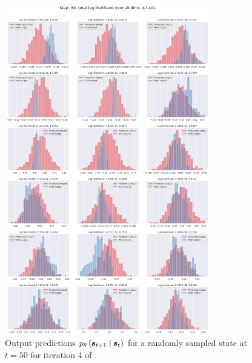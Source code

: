 \begin{figure}
    \centering
    \includegraphics[width=0.8\textwidth]{img/windyslope/output/windyslope_output_det2stoc2_dist_10_step50_iter4.png}
    \caption{Output predictions $\ptheta \protect\given*{\vns}{\vs}$ for a randomly sampled state at $t=50$ for iteration 4 of \dettostoc{}.}
    \label{fig:output_distribution_step50_posvel_dettostoc}
\end{figure}
